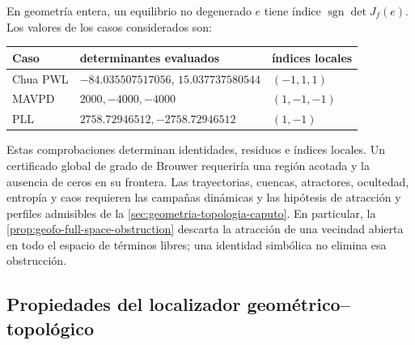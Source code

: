 En geometría entera, un equilibrio no degenerado \(e\) tiene índice
\(\operatorname{sgn}\det J_f(e)\). Los valores de los casos considerados son:
\begin{center}
\begin{tabular}{@{}lll@{}}
\toprule
Caso & determinantes evaluados & índices locales \\
\midrule
Chua PWL & \(-84.035507517056\), \(15.037737580544\)
 & \((-1,1,1)\)\\
MAVPD & \(2000,-4000,-4000\) & \((1,-1,-1)\)\\
PLL & \(2758.72946512,-2758.72946512\) & \((1,-1)\)\\
\bottomrule
\end{tabular}
\end{center}

Estas comprobaciones determinan identidades, residuos e índices locales. Un
certificado global de grado de Brouwer requeriría una región acotada y la
ausencia de ceros en su frontera. Las trayectorias, cuencas, atractores,
ocultedad, entropía y caos requieren las campañas dinámicas y las hipótesis de
atracción y perfiles admisibles de la \cref{sec:geometria-topologia-caputo}.
En particular, la \cref{prop:geofo-full-space-obstruction} descarta la
atracción de una vecindad abierta en todo el espacio de términos libres; una
identidad simbólica no elimina esa obstrucción.

\subsection{Propiedades del localizador geométrico--topológico}

